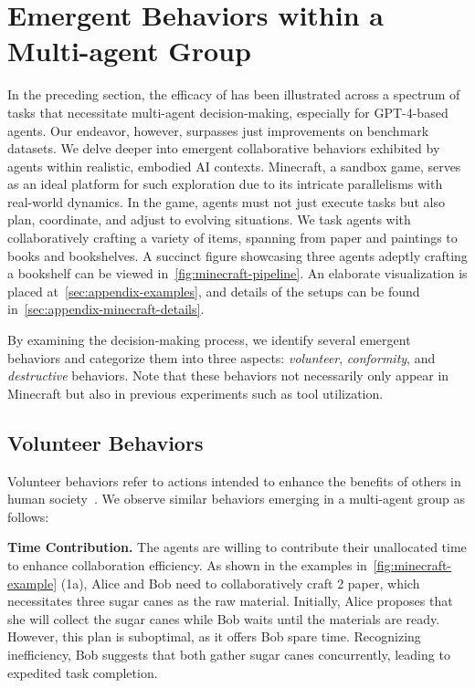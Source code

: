 
\section{Emergent Behaviors within a Multi-agent Group}
\label{ssec:emerging_behaviors}



In the preceding section, the efficacy of \framework has been illustrated across a spectrum of tasks that necessitate multi-agent decision-making, especially for GPT-4-based agents. Our endeavor, however, surpasses just improvements on benchmark datasets. We delve deeper into emergent collaborative behaviors exhibited by agents within realistic, embodied AI contexts. Minecraft, a sandbox game, serves as an ideal platform for such exploration due to its intricate parallelisms with real-world dynamics. In the game, agents must not just execute tasks but also plan, coordinate, and adjust to evolving situations. We task agents with collaboratively crafting a variety of items, spanning from paper and paintings to books and bookshelves. A succinct figure showcasing three agents adeptly crafting a bookshelf can be viewed in~\cref{fig:minecraft-pipeline}. An elaborate visualization is placed at~\cref{sec:appendix-examples}, and details of the setups can be found in~\cref{sec:appendix-minecraft-details}.

By examining the decision-making process, we identify several emergent behaviors and categorize them into three aspects: \textit{volunteer}, \textit{conformity}, and \textit{destructive} behaviors. Note that these behaviors not necessarily only appear in Minecraft but also in previous experiments such as tool utilization.



\subsection{Volunteer Behaviors}
\label{ssec:emergent-volunteer}
Volunteer behaviors refer to actions intended to enhance the benefits of others in human society~\citep{omoto1995sustained,mowen2005volunteer}. We observe similar behaviors emerging in a multi-agent group as follows:  


\textbf{Time Contribution.} 
The agents are willing to contribute their unallocated time to enhance collaboration efficiency. As shown in the examples in~\cref{fig:minecraft-example} (1a), Alice and Bob need to collaboratively craft 2 paper, which necessitates three sugar canes as the raw material. Initially, Alice proposes that she will collect the sugar canes while Bob waits until the materials are ready. However, this plan is suboptimal, as it offers Bob spare time. Recognizing inefficiency, Bob suggests that both gather sugar canes concurrently, leading to expedited task completion. 

